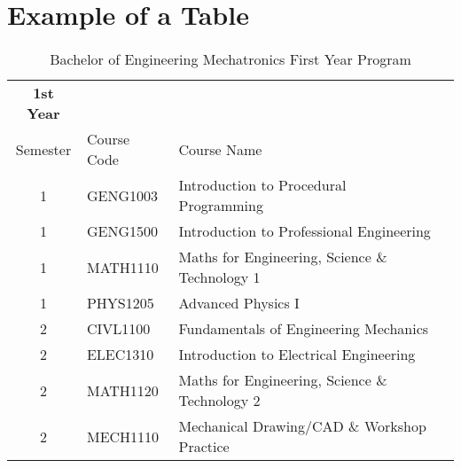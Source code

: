 \documentclass{UoNMCHA}
\numberwithin{equation}{section}
\begin{document}
\section{Example of a Table}\label{app:Table}
\begin{table}[h!]
    \begin{center}\label{tab:MCHAProg}
        \caption{Bachelor of Engineering Mechatronics First Year Program}\label{tab:notation}
        {\footnotesize
            \begin{tabular}{c l l l|}
                \hline\hline \textbf{1st Year} & & \\
                Semester & {Course Code} & {Course Name} \\ \hline 
                1 & GENG1003 & Introduction to Procedural Programming \\
                1 & GENG1500 & Introduction to Professional Engineering\\
                1 & MATH1110 & Maths for Engineering, Science \& Technology 1
\\
                1 & PHYS1205 & Advanced Physics I\\ \hline
                2 & CIVL1100 & Fundamentals of Engineering Mechanics\\
                2 & ELEC1310 & Introduction to Electrical Engineering\\
                2 & MATH1120 & Maths for Engineering, Science \& Technology 2 \\
                2 & MECH1110 & Mechanical Drawing/CAD \& Workshop Practice\\ \hline
            \end{tabular}
        }
    \end{center}
\end{table}
\end{document}
